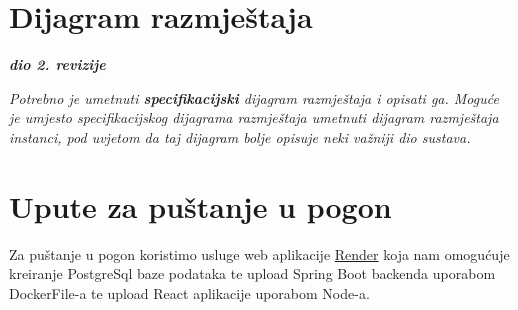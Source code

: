 			\eject 
		
		
		\section{Dijagram razmještaja}
			
			\textbf{\textit{dio 2. revizije}}
			
			 \textit{Potrebno je umetnuti \textbf{specifikacijski} dijagram razmještaja i opisati ga. Moguće je umjesto specifikacijskog dijagrama razmještaja umetnuti dijagram razmještaja instanci, pod uvjetom da taj dijagram bolje opisuje neki važniji dio sustava.}
			
			\eject 
		
		\section{Upute za puštanje u pogon}
			
			 \noindent Za puštanje u pogon koristimo usluge web aplikacije \href{www.render.com}{Render} koja nam omogućuje kreiranje PostgreSql baze podataka te upload Spring Boot backenda uporabom DockerFile-a te upload React aplikacije uporabom Node-a.\newline
			 
